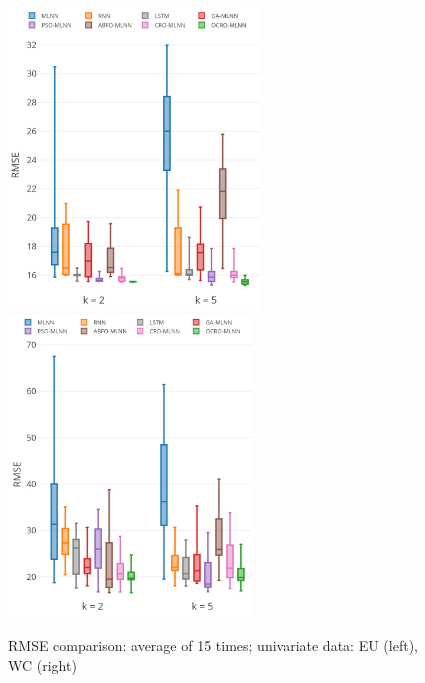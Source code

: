 \documentclass[smallcondensed, natbib]{svjour3}     %
\begin{document}
{\begin{figure}
	\centering
	\begin{minipage}[t]{1\textwidth}
		\centering
		\includegraphics[width=0.45\textwidth =0cm 0cm 0cm 0cm, height = 8cm]{images/pdf/stability/st_eu_2.pdf}
		\centering
		\includegraphics[width=0.45\textwidth =0cm 0cm 0cm 0cm, height = 8cm]{images/pdf/stability/st_wc_2.pdf}
	\end{minipage}
	\caption{RMSE comparison: average of 15 times; univariate data: EU (left), WC (right)} 
	\label{fig:stability_uni}
\end{figure}

}
\end{document}
